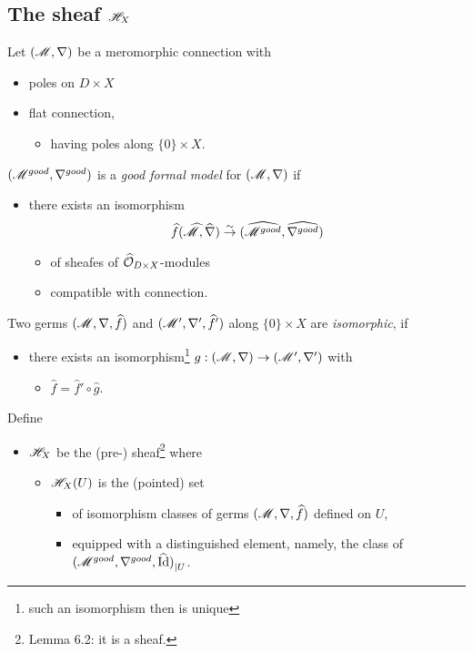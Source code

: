 \subsection{The sheaf $\mathscr{H}_X$}
\begin{defn}
  Let $(\mathscr{M},\nabla)$ be a meromorphic connection with
  \begin{itemize}
    \item poles on $D\times X$ 
    \item flat connection, 
      \begin{itemize}
        \item having poles along $\{0\}\times X$.
      \end{itemize}
  \end{itemize}
  \begin{defn}
    $(\mathscr{M}^{good},\nabla^{good})$ is a \emph{good formal model} for
    $(\mathscr{M},\nabla)$ if
    \begin{itemize}
      \item there exists an isomorphism 
        \[
          \widehat f(\widehat{\mathscr{M}},\widehat\nabla)\overset{\sim}{\to}
          (\widehat{\mathscr{M}^{good}},\widehat{\nabla^{good}})
        \]
        \begin{itemize}
          \item of sheafes of $\widehat{\mathcal{O}}_{D\times X}$-modules
          \item compatible with connection.
        \end{itemize}
    \end{itemize}
  \end{defn}
  \begin{defn}
    Two germs $(\mathscr{M},\nabla,\widehat f)$ and $(\mathscr{M}',\nabla',\widehat f')$ along
    $\{0\}\times X$ are \emph{isomorphic}, if
    \begin{itemize}
      \item there exists an isomorphism\footnote{such an isomorphism then is
        unique} $g:(\mathscr{M},\nabla)\to(\mathscr{M}',\nabla')$ with
        \begin{itemize}
          \item $\hat f=\hat f'\circ\hat g$.
        \end{itemize}
    \end{itemize}
  \end{defn}
  Define
  \begin{itemize}
    \item $\mathscr{H}_X$ be the (pre-) sheaf\footnote{Lemma 6.2: it is a sheaf.} where
      \begin{itemize}
        \item $\mathscr{H}_X(U)$ is the (pointed) set
          \begin{itemize}
            \item of isomorphism classes of germs $(\mathscr{M},\nabla,\widehat f)$ defined
              on $U$,
        \item equipped with a distinguished element, namely, the class of
          ${(\mathscr{M}^{good},\nabla^{good},\widehat{\operatorname{Id}})}_{|U}$.
          \end{itemize}
      \end{itemize}
  \end{itemize}
\end{defn}
